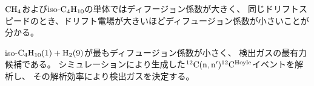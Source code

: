 ${\rm CH_{4}}$およびiso-${\rm C_{4}H_{10}}$の単体ではディフージョン係数が大きく、
同じドリフトスピードのとき、ドリフト電場が大きいほどディフュージョン係数が小さいことが分かる。

iso-${\rm C_{4}H_{10} (1) + H_{2}} (9)$が最もディフュージョン係数が小さく、
検出ガスの最有力候補である。
シミュレーションにより生成した${}^{12}{\rm C}({\rm n},{\rm n}'){}^{12}{\rm C}^{\rm Hoyle}$イベントを解析し、
その解析効率により検出ガスを決定する。


%
%
%


%
%
